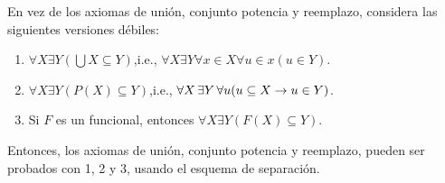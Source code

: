 \begin{exercise}[1.15]
  En vez de los axiomas de unión, conjunto potencia y reemplazo, considera las siguientes versiones débiles:
  \begin{enumerate}
    \item $\forall X \exists Y (\bigcup X \subseteq Y)$,\qquad i.e., $\forall X \exists Y  \forall x \in X  \forall u \in x  (u \in Y)$.
    
    \item $\forall X  \exists Y  (P(X) \subseteq Y)$,\qquad i.e., $\forall X \exists Y  \forall u  (u \subseteq X \lthen u \in Y)$.
    
    \item Si $F$ es un funcional, entonces $\forall X  \exists Y  (F(X) \subseteq Y)$.
  \end{enumerate}
  Entonces, los axiomas de unión, conjunto potencia y reemplazo, pueden ser probados con 1, 2 y 3, usando el esquema de separación.
\end{exercise}
